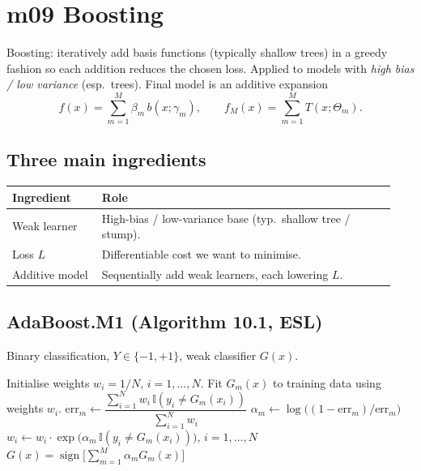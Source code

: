 \section{m09 Boosting}

Boosting: iteratively add basis functions (typically shallow trees) in a greedy fashion so each addition reduces the chosen loss. Applied to models with \emph{high bias / low variance} (esp.\ trees). Final model is an additive expansion
\[ f(x)=\sum_{m=1}^M \beta_m\, b(x;\gamma_m), \qquad f_M(x)=\sum_{m=1}^M T(x;\Theta_m). \]

\subsection{Three main ingredients}
\begin{tabular}{@{}p{0.22\linewidth} p{0.72\linewidth}@{}}
\toprule
Ingredient & Role \\
\midrule
Weak learner & High-bias / low-variance base (typ.\ shallow tree / stump). \\
Loss $L$ & Differentiable cost we want to minimise. \\
Additive model & Sequentially add weak learners, each lowering $L$. \\
\bottomrule
\end{tabular}

\subsection{AdaBoost.M1 (Algorithm 10.1, ESL)}
Binary classification, $Y\in\{-1,+1\}$, weak classifier $G(x)$.

\begin{algorithm}[H]
\caption{AdaBoost.M1 (ESL Alg.\ 10.1)}
\begin{algorithmic}[1]
\State Initialise weights $w_i = 1/N$, $i=1,\dots,N$.
  \State Fit $G_m(x)$ to training data using weights $w_i$.
  \State $\text{err}_m \gets \dfrac{\sum_{i=1}^N w_i\, \mathbb{I}(y_i \neq G_m(x_i))}{\sum_{i=1}^N w_i}$
  \State $\alpha_m \gets \log\!\big((1-\text{err}_m)/\text{err}_m\big)$
  \State $w_i \gets w_i \cdot \exp\!\big(\alpha_m\, \mathbb{I}(y_i \neq G_m(x_i))\big)$, $i=1,\dots,N$
\EndFor
\State \Return $G(x) = \operatorname{sign}\!\Big[\sum_{m=1}^M \alpha_m G_m(x)\Big]$
\end{algorithmic}
\end{algorithm}

